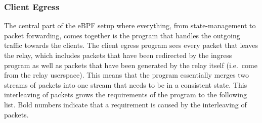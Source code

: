 \subsubsection{Client Egress}\label{sec:client-egress}
The central part of the eBPF setup where everything, from state-management to packet forwarding, 
comes together is the program that handles the outgoing traffic towards the clients.
The client egress program sees every packet that leaves the relay, which includes packets that have 
been redirected by the ingress program as well as packets that have been generated by the relay itself
(i.e.~come from the relay userspace).
This means that the program essentially merges two streams of packets into one stream that needs to 
be in a consistent state.
This interleaving of packets grows the requirements of the program to the following list.
Bold numbers indicate that a requirement is caused by the interleaving of packets.
